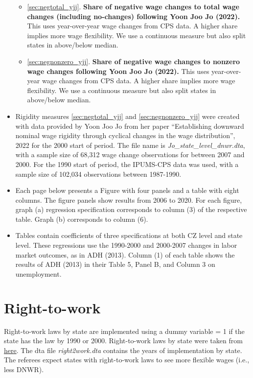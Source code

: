\documentclass[12pt]{article}
\begin{document}
\begin{itemize}
\begin{itemize}
    \item \ref{sec:negtotal_yjj}. \textbf{Share of negative wage changes to total wage changes (including no-changes) following Yoon Joo Jo (2022).} This uses year-over-year wage changes from CPS data. A higher share implies more wage flexibility. We use a continuous measure but also split states in above/below median.
    \item \ref{sec:negnonzero_yjj}. \textbf{Share of negative wage changes to nonzero wage changes following Yoon Joo Jo (2022).} This uses year-over-year wage changes from CPS data. A higher share implies more wage flexibility. We use a continuous measure but also split states in above/below median.
 
\end{itemize}


    \item  Rigidity measures \ref{sec:negtotal_yjj} and \ref{sec:negnonzero_yjj} were created with data provided by Yoon Joo Jo from her paper ``Establishing downward nominal wage rigidity through cyclical changes in the wage distribution'', 2022 for the 2000 start of period. The file name is \textit{Jo\_state\_level\_dnwr.dta}, with a sample size of 68,312 wage change observations for between 2007 and 2000. For the 1990 start of period, the IPUMS-CPS data was used, with a sample size of 102,034 observations between 1987-1990. 
    \item Each page below presents a Figure with four panels and a table with eight columns. The figure panels show results from 2006 to 2020. For each figure, graph (a) regression specification corresponds to column (3) of the respective table. Graph (b) corresponds to column (6). 
    \item Tables contain coefficients of three specifications at both CZ level and state level. These regressions use the 1990-2000 and 2000-2007 changes in labor market outcomes, as in ADH (2013). Column (1) of each table shows the results of ADH (2013) in their Table 5, Panel B, and Column 3 on unemployment.

\end{itemize}


\newpage
\section{Right-to-work}\label{sec:r2w}
Right-to-work laws by state are implemented using a dummy variable = 1 if the state has the law by 1990 or 2000. Right-to-work laws by state were taken from \href{https://nrtwc.org/facts/state-right-to-work-timeline-2016/}{here}. The dta file \textit{right2work.dta} contains the years of implementation by state. The referees expect states with right-to-work laws to see more flexible wages (i.e., less DNWR).
\end{document}

